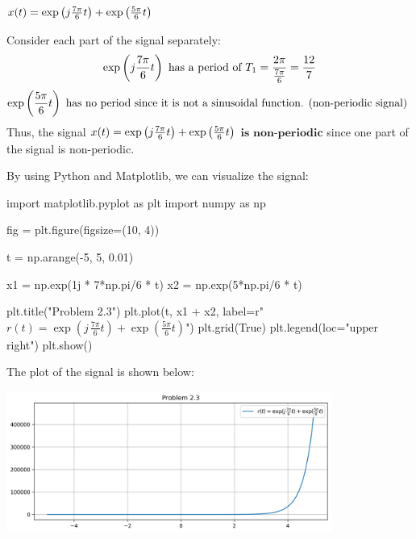 \documentclass[a4paper, 10pt]{article}
\begin{document}
\newpage

\begin{subproblems}[start=3]
    \item \( x(t) = \exp \left( j\frac{7\pi}{6}t \right) +  \exp \left( \frac{5\pi}{6}t \right) \)
\end{subproblems}

\begin{solution}
Consider each part of the signal separately:
\[
\exp \left( j\frac{7\pi}{6}t \right) \text{ has a period of } T_1 = \frac{2\pi}{\frac{7\pi}{6}} = \frac{12}{7}
\]
\[
\exp \left( \frac{5\pi}{6}t \right) \text{ has no period since it is not a sinusoidal function. (non-periodic signal) }
\]
Thus, the signal \( x(t) = \exp \left( j\frac{7\pi}{6}t \right) +  \exp \left( \frac{5\pi}{6}t \right) \) \( \boxed{\textbf{is non-periodic}} \) since one part of the signal is non-periodic.

\vspace{5mm}

By using Python and Matplotlib, we can visualize the signal:
\begin{codingbox}
import matplotlib.pyplot as plt
import numpy as np

fig = plt.figure(figsize=(10, 4))

t = np.arange(-5, 5, 0.01)

x1 = np.exp(1j * 7*np.pi/6 * t)
x2 = np.exp(5*np.pi/6 * t)

plt.title("Problem 2.3")
plt.plot(t, x1 + x2, label=r"$r(t) = \exp(j\,\frac{7\pi}{6}t) + \exp(\frac{5\pi}{6}t)$")
plt.grid(True)
plt.legend(loc="upper right")
plt.show()
\end{codingbox}
The plot of the signal is shown below:
\begin{center}
    \includegraphics[width=0.8\textwidth]{images/problem_2_3.png}
\end{center}
\end{solution}

\newpage
\end{document}
